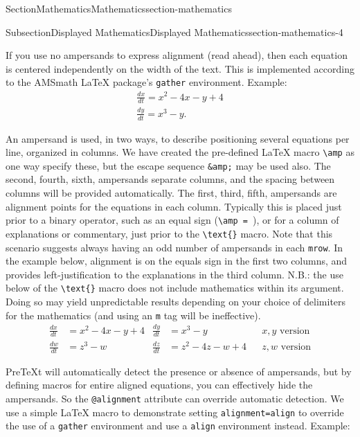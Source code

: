 \documentclass[twoside,10pt,]{article}
\newcommand{\mono}[1]{\texttt{#1}}
\numberwithin{equation}{section}
\newcommand{\amp}{&}
\begin{document}
\begin{sectionptx}{Section}{Mathematics}{}{Mathematics}{}{}{section-mathematics}
\begin{subsectionptx}{Subsection}{Displayed Mathematics}{}{Displayed Mathematics}{}{}{section-mathematics-4}
\par
If you use no ampersands to express alignment (read ahead), then each equation is centered independently on the width of the text.  This is implemented according to the AMSmath \LaTeX{} package's \mono{gather} environment.  Example:%
\begin{gather*}
\frac{dx}{dt} = x^2 - 4x - y + 4\\
\frac{dy}{dt} = x^3 - y.
\end{gather*}
%
\par
An ampersand is used, in two ways, to describe positioning several equations per line, organized in columns.  We have created the pre-defined \LaTeX{} macro \mono{\textbackslash{}amp} as one way specify these, but the escape sequence \mono{\&amp;} may be used also.  The second, fourth, sixth, \textellipsis{} ampersands separate columns, and the spacing between columns will be provided automatically.  The first, third, fifth, \textellipsis{} ampersands are alignment points for the equations in each column.  Typically this is placed just prior to a binary operator, such as an equal sign (\mono{\textbackslash{}amp = }), or for a column of explanations or commentary, just prior to the \mono{\textbackslash{}text\{\}} macro.  Note that this scenario suggests always having an odd number of ampersands in each \mono{mrow}.  In the example below, alignment is on the equals sign in the first two columns, and provides left-justification to the explanations in the third column.  N.B.: the use below of the \mono{\textbackslash{}text\{\}} macro does not include mathematics within its argument.  Doing so may yield unpredictable results depending on your choice of delimiters for the mathematics (and using an \mono{m} tag will be ineffective).%
\begin{align*}
\frac{dx}{dt} \amp = x^2 - 4x - y + 4 \amp \frac{dy}{dt} \amp = x^3 - y          \amp\amp x, y\text{ version}\\
\frac{dw}{dt} \amp = z^3 - w          \amp \frac{dz}{dt} \amp = z^2 - 4z - w + 4 \amp\amp z, w\text{ version}
\end{align*}
%
\par
PreTeXt will automatically detect the presence or absence of ampersands, but by defining macros for entire aligned equations, you can effectively hide the ampersands.  So the \mono{@alignment} attribute can override automatic detection.  We use a simple \LaTeX{} macro to demonstrate setting \mono{alignment=\textquotesingle{}align\textquotesingle{}} to override the use of a \mono{gather} environment and use a \mono{align} environment instead.  Example:%

\end{subsectionptx}
\end{sectionptx}
\end{document}

